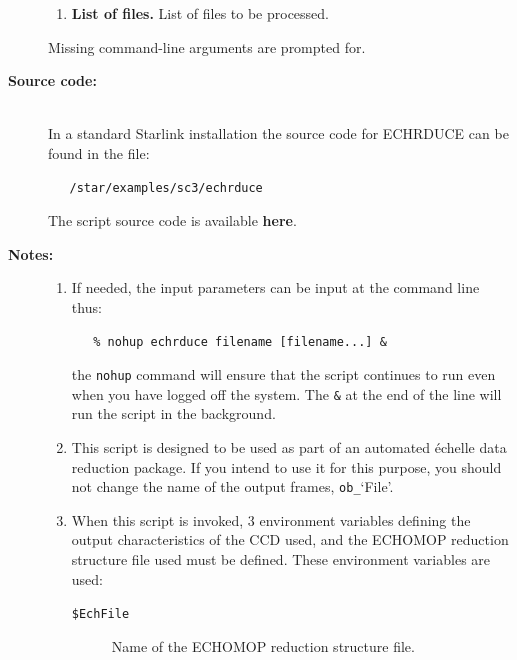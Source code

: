 \documentclass[twoside,11pt]{article}
\newenvironment{latexonly}{}{}
\newcommand{\htmlref}[2]{#1}
\begin{document}
\begin{description}
\begin{enumerate}
\item {\bf List of files.}
      List of files to be processed.

\end{enumerate}

     Missing command-line arguments are prompted for.

\item [{\bf Source code:}] \mbox{} \\
\begin{latexonly}
In a standard Starlink installation the source code for ECHRDUCE can be found
in the file:
\begin{verbatim}
   /star/examples/sc3/echrduce
\end{verbatim}
\end{latexonly}
\begin{htmlonly}
      The script source code is available
      \htmlref{{\bf here}}{se_echrduce_source}.
\end{htmlonly}

\item [{\bf Notes:}] \mbox{}
\begin{enumerate}

\item If needed, the input parameters can be input at the command
      line thus:

\begin{verbatim}
   % nohup echrduce filename [filename...] &
\end{verbatim}

      the \verb+nohup+ command will ensure that the script continues
      to run even when you have logged off the system.  The \verb+&+ at
      the end of the line will run the script in the background.

\item This script is designed to be used as part of an automated
      \'{e}chelle data reduction package.  If you intend to use it
      for this purpose, you should not change the name of the output
      frames, \verb+ob_+`File'.

\item When this script is invoked, 3 environment variables defining
      the output characteristics of the CCD used, and the ECHOMOP
      reduction structure file used must be defined.
      These environment variables are used:

\begin{description}

\item [{\tt{\$EchFile}}]
      Name of the ECHOMOP reduction structure file.


\end{description}
\end{enumerate}
\end{description}
\end{document}
